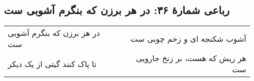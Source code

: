 \begin{center}
\section*{رباعی شمارهٔ ۳۶: در هر برزن که بنگرم آشوبی ست}
\label{sec:036}
\begin{longtable}{l p{0.5cm} r}
در هر برزن که بنگرم آشوبی ست
&&
آشوب شکنجه ای و زخم چوبی ست
\\
تا پاک کنند گیتی از یک دیکر
&&
هر ریش که هست، بر زنخ جارویی ست
\\
\end{longtable}
\end{center}
